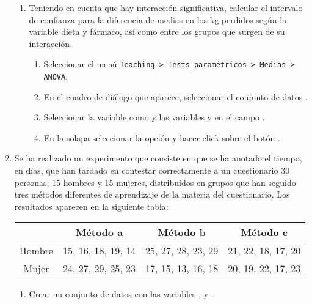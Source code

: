 \begin{enumerate}[leftmargin=*]
\begin{enumerate}
\item Teniendo en cuenta que hay interacción significativa, calcular el intervalo de confianza para la diferencia de
medias en los kg perdidos según la variable dieta y fármaco, así como entre los grupos que surgen de su interacción.
\begin{indicacion}
\begin{enumerate}
\item Seleccionar el menú \texttt{Teaching > Tests paramétricos > Medias > ANOVA}.
\item En el cuadro de diálogo que aparece, seleccionar el conjunto de datos .
\item Seleccionar la variable  como  y las variables  y  en el campo .
\item En la solapa  seleccionar la opción  y hacer
click sobre el botón .
\end{enumerate}
\end{indicacion}
\end{enumerate}


\item Se ha realizado un experimento que consiste en que se ha anotado el tiempo, en días, que han tardado en contestar
correctamente a un cuestionario 30 personas, 15 hombres y 15 mujeres, distribuidos en grupos que han seguido tres
métodos diferentes de aprendizaje de la materia del cuestionario. Los resultados aparecen en la siguiente tabla:

\begin{center}
\begin{tabular}{|c|c|c|c|}
\cline{2-4}
\multicolumn{1}{c|}{} & Método a & Método b & Método c\\
\hline
Hombre & 15, 16, 18, 19, 14 & 25, 27, 28, 23, 29 & 21, 22, 18, 17, 20 \\
\hline
Mujer & 24, 27, 29, 25, 23 & 17, 15, 13, 16, 18 & 20, 19, 22, 17, 23 \\
\hline
\end{tabular}
\end{center}

\begin{enumerate}
\item Crear un conjunto de datos  con las variables ,  y .


\end{enumerate}
\end{enumerate}

